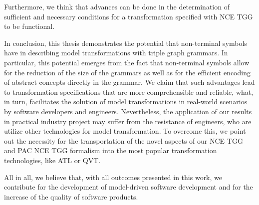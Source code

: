 Furthermore, we think that advances can be done in the determination of sufficient and necessary conditions for a transformation specified with NCE TGG to be functional.

In conclusion, this thesis demonstrates the potential that non-terminal symbols have in describing model transformations with triple graph grammars. In particular, this potential emerges from the fact that non-terminal symbols allow for the reduction of the size of the grammars as well as for the efficient encoding of abstract concepts directly in the grammar. We claim that such advantages lead to transformation specifications that are more comprehensible and reliable, what, in turn, facilitates the solution of model transformations in real-world scenarios by software developers and engineers. Nevertheless, the application of our results in practical industry project may suffer from the resistance of engineers, who are utilize other technologies for model transformation. To overcome this, we point out the necessity for the transportation of the novel aspects of our NCE TGG and PAC NCE TGG formalism into the most popular transformation technologies, like ATL or QVT.

All in all, we believe that, with all outcomes presented in this work, we contribute for the development of model-driven software development and for the increase of the quality of software products.





